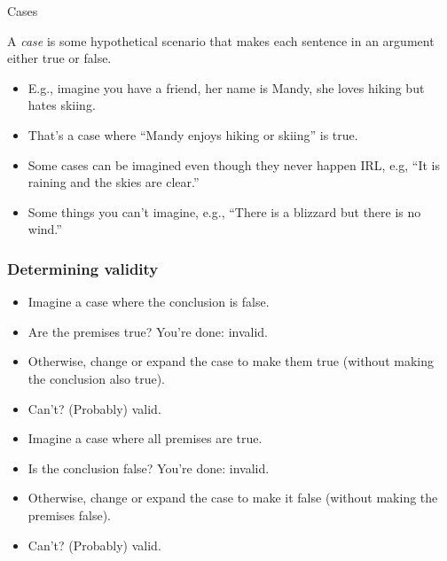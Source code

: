 \begin{frame}{Cases}
  
\begin{definition}
  A \emph{case} is some hypothetical scenario that makes each sentence
  in an argument either true or false.
\end{definition}

\begin{itemize}[<+->]
  \item E.g., imagine you have a friend, her name is Mandy, she loves
  hiking but hates skiing.
  \item That's a case where ``Mandy enjoys hiking or skiing'' is true.
  \item Some cases can be imagined even though they never happen IRL, e.g,
  ``It is raining and the skies are clear.''
  \item Some things you can't imagine, e.g.,
  ``There is a blizzard but there is no wind.''
\end{itemize}

\end{frame}

\begin{frame}
  \frametitle{Determining validity}

  \begin{itemize}[<+->]
    \item Imagine a case where the conclusion is false.
    \item Are the premises true? You're done: invalid.
    \item Otherwise, change or expand the case to make them true
    (without making the conclusion also true).
    \item Can't? (Probably) valid.
  \end{itemize}


  \begin{itemize}[<+->]
    \item Imagine a case where all premises are true.
    \item Is the conclusion false? You're done: invalid.
    \item Otherwise, change or expand the case to make it false
    (without making the premises false).
    \item Can't? (Probably) valid.
  \end{itemize}
\end{frame}


